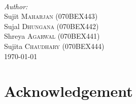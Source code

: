 \documentclass[12pt]{article}
\begin{document}
\begin{titlepage}
~

\Large \emph{Author:}\\
Sujit \textsc{Maharjan} (070BEX443) \\
Sujal \textsc{Dhungana} (070BEX442)\\
Shreya \textsc{Agarwal} (070BEX441)\\
Sujita \textsc{Chaudhary} (070BEX444)\\[1cm]


{\large \today}\\[1cm] %


\vfill %

\end{titlepage}

\section{Acknowledgement}
\end{document}
